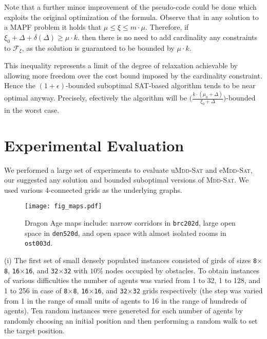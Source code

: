 \documentclass[letterpaper]{article}
\begin{document}
Note that a further minor improvement of the pseudo-code could be done which
exploits the original optimization of the formula. Observe that in any solution 
to a MAPF problem it holds that $\mu \leq \xi
\leq {m\cdot\mu}$. Therefore, 
if $\xi_0+\Delta+\delta(\Delta) \geq \mu \cdot k$.
then there is no need to add cardinality any constraints to 
$\mathcal{F}_\xi$, as the solution is guaranteed to be bounded by $\mu \cdot k$. 


This inequality represents a limit of the degree of
relaxation achievable by allowing more freedom over the cost bound imposed by
the cardinality constraint. Hence the $(1+\epsilon)$-bounded suboptimal
SAT-based algorithm tends to be near optimal anyway. Precisely, efectively the
algorithm will be $\big(\frac{k \cdot (\mu_0 +
\Delta)}{\xi_0+\Delta}\big)$-bounded in the worst case.

\section{Experimental Evaluation}

We performed a large set of experiments to evaluate
u\textsc{Mdd-Sat} and e\textsc{Mdd-Sat}, our suggested any solution 
and bounded suboptimal versions of \textsc{Mdd-Sat}. We used various
4-connected grids as the underlying graphs.

\begin{figure}[h]
\centering
\texttt{[image: fig\_maps.pdf]}
\vspace{-0.4cm}\caption{Dragon Age maps  include: narrow corridors in \texttt{brc202d}, large open space in \texttt{den520d}, and open space with almost isolated rooms in \texttt{ost003d}.} \label{figure-maps}
\end{figure}

(i) The first set of small densely populated instances consisted of girds of
sizes \texttt{8$\times$8}, \texttt{16$\times$16}, and \texttt{32$\times$32}
with $10\%$ nodes occupied by obstacles. To obtain instances of various
difficulties the number of agents was varied from 1 to 32, 1 to 128, and 1 to
256 in case of \texttt{8$\times$8}, \texttt{16$\times$16}, and
\texttt{32$\times$32} grids respectively (the step was varied from 1 in the
range of small units of agents to 16 in the range of hundreds of agents). Ten
random  instances were genereted for each number of agents by randomly choosing an initial position
and then performing a random walk to set the target position. 
\end{document}
